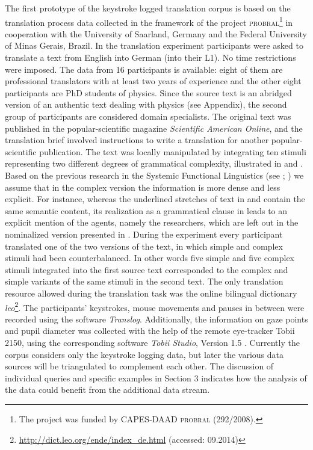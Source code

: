 \documentclass[output=paper]{LSP/langsci}
\begin{document}
The first prototype of the keystroke logged translation corpus is based on the translation process data collected in the framework of the project \textsc{probral}\footnote{The project was funded by CAPES-DAAD \textsc{probral} (292/2008).} in cooperation with the University of Saarland, Germany and the Federal University of Minas Gerais, Brazil. In the translation experiment participants were asked to translate a text from English into German (into their L1). No time restrictions were imposed. The data from 16 participants is available: eight of them are professional translators with at least two years of experience and the other eight participants are PhD students of physics. Since the source text is an abridged version of an authentic text dealing with physics (see Appendix), the second group of participants are considered domain specialists. The original text was published in the popular-scientific magazine \textit{Scientific American Online}, and the translation brief involved instructions to write a translation for another popular-scientific publication. The text was locally manipulated by integrating ten stimuli representing two different degrees of grammatical complexity, illustrated in  and . Based on the previous research in the Systemic Functional Linguistics (see \citealt[715]{Halliday2014}; \citealt[8-10]{Taverniers2003}) we assume that in the complex version the information is more dense and less explicit. For instance, whereas the underlined stretches of text in  and  contain the same semantic content, its realization as a grammatical clause in  leads to an explicit mention of the agents, namely the researchers, which are left out in the nominalized version presented in . During the experiment every participant translated one of the two versions of the text, in which simple and complex stimuli had been counterbalanced. In other words five simple and five complex stimuli integrated into the first source text corresponded to the complex and simple variants of the same stimuli in the second text. The only translation resource allowed during the translation task was the online bilingual dictionary \textit{leo}\footnote{\url{http://dict.leo.org/ende/index_de.html} (accessed: 09.2014)}. The participants’ keystrokes, mouse movements and pauses in between were recorded using the software \textit{Translog}. Additionally, the information on gaze points and pupil diameter was collected with the help of the remote eye-tracker Tobii 2150, using the corresponding software \textit{Tobii Studio}, Version 1.5 \citep{Tobii2008}. Currently the corpus considers only the keystroke logging data, but later the various data sources will be triangulated \citep[see][]{Alves2003} to complement each other. The discussion of individual queries and specific examples in Section 3 indicates how the analysis of the data could benefit from the additional data stream. 
\end{document}
